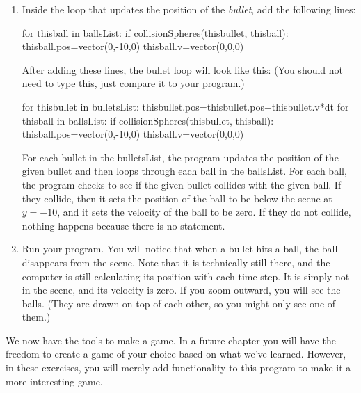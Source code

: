 \begin{enumerate}
\item Inside the  loop that updates the position of the \emph{bullet}, add the following lines:

\begin{myvpython}
        for thisball in ballsList:
            if collisionSpheres(thisbullet, thisball):
                thisball.pos=vector(0,-10,0)
                thisball.v=vector(0,0,0)
\end{myvpython}

After adding these lines, the bullet  loop will look like this: (You should not need to type this, just compare it to your program.)

\begin{myvpython}
    for thisbullet in bulletsList:
        thisbullet.pos=thisbullet.pos+thisbullet.v*dt
        for thisball in ballsList:
            if collisionSpheres(thisbullet, thisball):
                thisball.pos=vector(0,-10,0)
                thisball.v=vector(0,0,0)
\end{myvpython}

For each bullet in the bulletsList, the program updates the position of the given bullet and then loops through each ball in the ballsList. For each ball, the program checks to see if the given bullet collides with the given ball. If they collide, then it sets the position of the ball to be below the scene at $y=-10$, and it sets the velocity of the ball to be zero. If they do not collide, nothing happens because there is no  statement.

\item Run your program. You will notice that when a bullet hits a ball, the ball disappears from the scene. Note that it is technically still there, and the computer is still calculating its position with each time step. It is simply not in the scene, and its velocity is zero. If you zoom outward, you will see the balls. (They are drawn on top of each other, so you might only see one of them.)

\end{enumerate}

\pagebreak

\analysis

We now have the tools to make a game. In a future chapter you will have the freedom to create a game of your choice based on what we've learned. However, in these exercises, you will merely add functionality to this program to make it a more interesting game.

